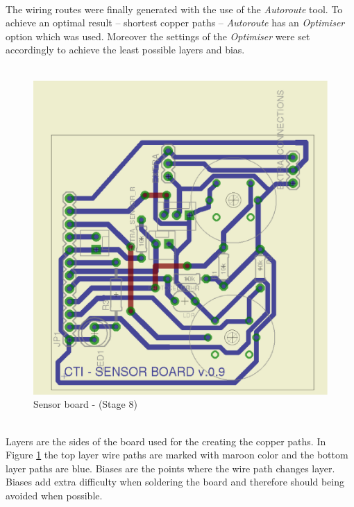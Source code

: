 \documentclass[12pt,a4paper,draft]{report}
\begin{document}
\ \\
The wiring routes were finally generated with the use of the \textit{Autoroute} tool.
To achieve an optimal result -- shortest copper paths -- \textit{Autoroute} has an \textit{Optimiser} option which was used.
Moreover the settings of the \textit{Optimiser} were set accordingly to achieve the least possible layers and bias.\\
\ \\
\begin{figure}[H]
\centering
\includegraphics*[scale=0.25]{sens_brd_s8}
\caption{Sensor board -  (Stage 8)}
\label{Sensor-brd-s8}
\end{figure}
\ \\
Layers are the sides of the board used for the creating the copper paths.
In Figure \ref{Sensor-brd-s8} the top layer wire paths are marked with maroon color and the bottom layer paths are blue.
Biases are the points where the wire path changes layer.
Biases add extra difficulty when soldering the board and therefore should being avoided when possible.\\
\ \\
%
\end{document}

